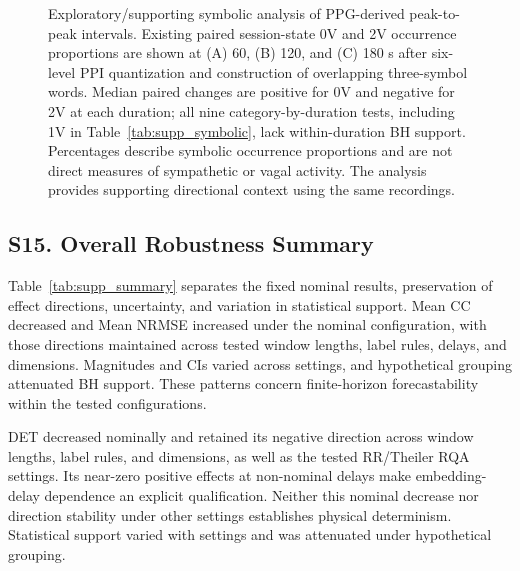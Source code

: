 \begin{figure}[p]
\centering
{}
\caption{Exploratory/supporting symbolic analysis of PPG-derived peak-to-peak intervals. Existing paired session-state 0V and 2V occurrence proportions are shown at (A) 60, (B) 120, and (C) 180 s after six-level PPI quantization and construction of overlapping three-symbol words. Median paired changes are positive for 0V and negative for 2V at each duration; all nine category-by-duration tests, including 1V in Table~\ref{tab:supp_symbolic}, lack within-duration BH support. Percentages describe symbolic occurrence proportions and are not direct measures of sympathetic or vagal activity. The analysis provides supporting directional context using the same recordings.}
\label{fig:supp_symbolic}
\end{figure}
\subsection*{S15. Overall Robustness Summary}
Table~\ref{tab:supp_summary} separates the fixed nominal results, preservation of effect directions, uncertainty, and variation in statistical support. Mean CC decreased and Mean NRMSE increased under the nominal configuration, with those directions maintained across tested window lengths, label rules, delays, and dimensions. Magnitudes and CIs varied across settings, and hypothetical grouping attenuated BH support. These patterns concern finite-horizon forecastability within the tested configurations.

DET decreased nominally and retained its negative direction across window lengths, label rules, and dimensions, as well as the tested RR/Theiler RQA settings. Its near-zero positive effects at non-nominal delays make embedding-delay dependence an explicit qualification. Neither this nominal decrease nor direction stability under other settings establishes physical determinism. Statistical support varied with settings and was attenuated under hypothetical grouping.

